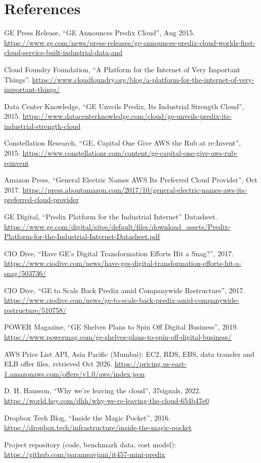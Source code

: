 \documentclass[12pt,a4paper]{article}
\begin{document}
\section*{References}
\begin{enumerate}[label={[\arabic*]},leftmargin=2.2em,itemsep=4pt]
  \item GE Press Release, ``GE Announces Predix Cloud'', Aug 2015. \url{https://www.ge.com/news/press-releases/ge-announces-predix-cloud-worlds-first-cloud-service-built-industrial-data-and}
  \item Cloud Foundry Foundation, ``A Platform for the Internet of Very Important Things''. \url{https://www.cloudfoundry.org/blog/a-platform-for-the-internet-of-very-important-things/}
  \item Data Center Knowledge, ``GE Unveils Predix, Its Industrial Strength Cloud'', 2015. \url{https://www.datacenterknowledge.com/cloud/ge-unveils-predix-its-industrial-strength-cloud}
  \item Constellation Research, ``GE, Capital One Give AWS the Rub at re:Invent'', 2015. \url{https://www.constellationr.com/content/ge-capital-one-give-aws-rub-reinvent}
  \item Amazon Press, ``General Electric Names AWS Its Preferred Cloud Provider'', Oct 2017. \url{https://press.aboutamazon.com/2017/10/general-electric-names-aws-its-preferred-cloud-provider}
  \item GE Digital, ``Predix Platform for the Industrial Internet'' Datasheet. \url{https://www.ge.com/digital/sites/default/files/download_assets/Predix-Platform-for-the-Industrial-Internet-Datasheet.pdf}
  \item CIO Dive, ``Have GE's Digital Transformation Efforts Hit a Snag?'', 2017. \url{https://www.ciodive.com/news/have-ges-digital-transformation-efforts-hit-a-snag/503736/}
  \item CIO Dive, ``GE to Scale Back Predix amid Companywide Restructure'', 2017. \url{https://www.ciodive.com/news/ge-to-scale-back-predix-amid-companywide-restructure/510758/}
  \item POWER Magazine, ``GE Shelves Plans to Spin Off Digital Business'', 2019. \url{https://www.powermag.com/ge-shelves-plans-to-spin-off-digital-business/}
  \item AWS Price List API, Asia Pacific (Mumbai): EC2, RDS, EBS, data transfer and ELB offer files, retrieved Oct 2026. \url{https://pricing.us-east-1.amazonaws.com/offers/v1.0/aws/index.json}
  \item D. H. Hansson, ``Why we're leaving the cloud'', 37signals, 2022. \url{https://world.hey.com/dhh/why-we-re-leaving-the-cloud-654b47e0}
  \item Dropbox Tech Blog, ``Inside the Magic Pocket'', 2016. \url{https://dropbox.tech/infrastructure/inside-the-magic-pocket}
  \item Project repository (code, benchmark data, cost model): \url{https://github.com/paramsavjani/it457-mini-predix}
\end{enumerate}
\end{document}

